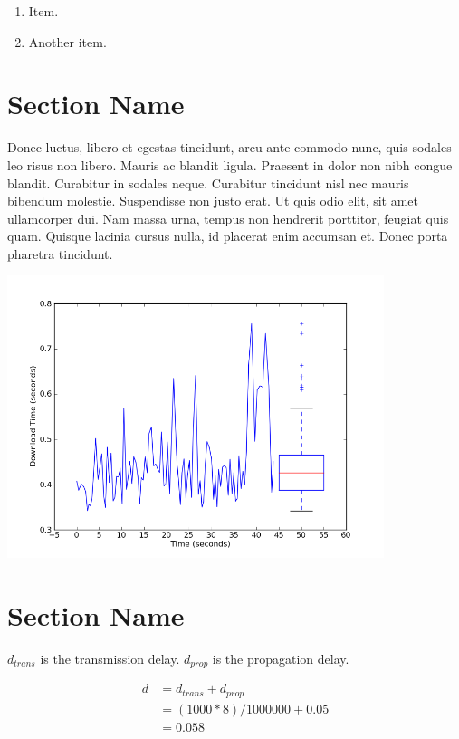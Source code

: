 \documentclass[fleqn,11pt]{article}
\begin{document}
\begin{enumerate}

\item Item.

\item Another item.

\end{enumerate}

\section{Section Name}

Donec luctus, libero et egestas tincidunt, arcu ante commodo nunc,
quis sodales leo risus non libero. Mauris ac blandit ligula. Praesent
in dolor non nibh congue blandit. Curabitur in sodales
neque. Curabitur tincidunt nisl nec mauris bibendum
molestie. Suspendisse non justo erat. Ut quis odio elit, sit amet
ullamcorper dui. Nam massa urna, tempus non hendrerit porttitor,
feugiat quis quam. Quisque lacinia cursus nulla, id placerat enim
accumsan et. Donec porta pharetra tincidunt.

\includegraphics[width=11cm]{graphs/download-combined}

\section{Section Name}

$d_{trans}$ is the transmission delay. $d_{prop}$ is the propagation delay.

\begin{align*}
d &= d_{trans} + d_{prop}\\
  &= (1000*8)/1000000 + 0.05\\
  &= 0.058
\end{align*}
\end{document}
